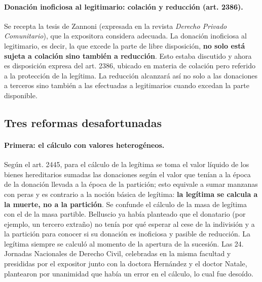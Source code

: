 \documentclass[12pt,oneside]{book}
\begin{document}
\paragraph{Donación inoficiosa al legitimario: colación y reducción (art. 2386).} Se recepta la tesis de Zannoni (expresada en la revista \textit{Derecho Privado Comunitario}), que la expositora considera adecuada. La donación inoficiosa al legitimario, es decir, la que excede la parte de libre disposición, \textbf{no solo está sujeta a colación sino también a reducción}. Esto estaba discutido y ahora es disposición expresa del art. 2386, ubicado en materia de colación pero referido a la protección de la legítima. La reducción alcanzará así no solo a las donaciones a terceros sino también a las efectuadas a legitimarios cuando excedan la parte disponible.

\subsection{Tres reformas desafortunadas}

\paragraph{Primera: el cálculo con valores heterogéneos.} Según el art. 2445, para el cálculo de la legítima se toma el valor líquido de los bienes hereditarios sumadas las donaciones según el valor que tenían a la época de la donación llevada a la época de la partición; esto equivale a sumar manzanas con peras y es contrario a la noción básica de legítima: \textbf{la legítima se calcula a la muerte, no a la partición}. Se confunde el cálculo de la masa de legítima con el de la masa partible. Belluscio ya había planteado que el donatario (por ejemplo, un tercero extraño) no tenía por qué esperar al cese de la indivisión y a la partición para conocer si su donación es inoficiosa y pasible de reducción. La legítima siempre se calculó al momento de la apertura de la sucesión. Las 24.\textordfeminine{} Jornadas Nacionales de Derecho Civil, celebradas en la misma facultad y presididas por el expositor junto con la doctora Hernández y el doctor Natale, plantearon por unanimidad que había un error en el cálculo, lo cual fue desoído.
\end{document}
